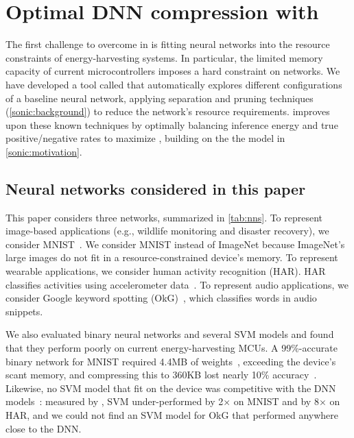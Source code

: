 \figSONICGenesisNNs
\section{Optimal DNN compression with \genesis}
\label{sonic:genesis}

The first challenge to overcome in \sonictails is fitting neural networks into the
resource constraints of energy-harvesting systems.
%
In particular, the limited memory capacity of current microcontrollers
imposes a hard constraint on networks.
%
We have developed a tool called \genesis
that automatically
explores different configurations of a baseline neural network,
applying separation and pruning techniques (\autoref{sonic:background}) to reduce the network's resource requirements.
%
\genesis improves upon these known techniques by
optimally balancing inference energy and true positive/negative rates to maximize \metric,
building on the the model in \autoref{sonic:motivation}.

\subsection{Neural networks considered in this paper}

%
This paper considers three networks, summarized in \autoref{tab:nns}.
%
To represent image-based applications (e.g., wildlife monitoring and
disaster recovery), we consider MNIST~\cite{lecun1998mnist}. We consider
MNIST instead of ImageNet because ImageNet's large images 
do not fit in a resource-constrained device's memory.
%
To represent wearable applications, we consider human activity recognition
(HAR). HAR classifies activities using accelerometer data~\cite{har}.
%
To represent audio applications, we consider Google keyword
spotting (OkG)~\cite{okgoogle}, which classifies words in audio snippets.

We also evaluated binary neural networks and several SVM models
and found that they perform poorly on current energy-harvesting MCUs.
%
A 99\%-accurate binary network for MNIST required 4.4MB of weights~\cite{courbariaux2016binarized},
exceeding the device's scant memory, and compressing this to 360KB lost nearly 10\% accuracy~\cite{binarynetgithub}.
%
Likewise, no SVM model that fit on the device was competitive with 
the DNN models~\cite{lecun1998gradient}: measured by \metric, SVM under-performed 
by 2$\times$ on MNIST and by 8$\times$ on HAR, and we could not find an SVM model 
for OkG that performed anywhere close to the DNN.

